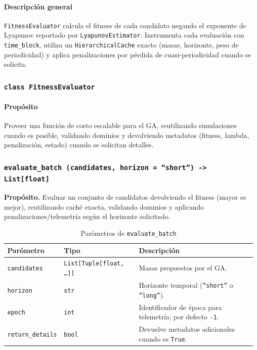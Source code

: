 \paragraph{Descripción general}
\texttt{FitnessEvaluator} calcula el fitness de cada candidato negando el exponente de Lyapunov reportado por \texttt{LyapunovEstimator}. Instrumenta cada evaluación con \texttt{time\_block}, utiliza un \texttt{HierarchicalCache} exacto (masas, horizonte, peso de periodicidad) y aplica penalizaciones por pérdida de cuasi-periodicidad cuando se solicita.

\subsubsection{\texttt{class FitnessEvaluator}}
\paragraph{Propósito} Proveer una función de costo escalable para el GA, reutilizando simulaciones cuando es posible, validando dominios y devolviendo metadatos (fitness, lambda, penalización, estado) cuando se solicitan detalles.

\subsubsection*{\texttt{evaluate\_batch~(candidates, horizon = ``short'') -> List[float]}}
\textbf{Propósito.} Evaluar un conjunto de candidatos devolviendo el fitness (mayor es mejor), reutilizando caché exacta, validando dominios y aplicando penalizaciones/telemetría según el horizonte solicitado.

\begin{table}[H]
  \centering
  \caption{Parómetros de \texttt{evaluate\_batch}}
  \small
  \begin{tabularx}{\textwidth}{@{}p{}p{}X@{}}
    \toprule
    \textbf{Parómetro} & \textbf{Tipo} & \textbf{Descripción} \\
    \midrule
    \texttt{candidates} & \texttt{List[Tuple[float, \dots]]} & Masas propuestos por el GA.\\
    \texttt{horizon} & \texttt{str} & Horizonte temporal (\texttt{``short''} o \texttt{``long''}).\\
    \texttt{epoch} & \texttt{int} & Identificador de época para telemetría; por defecto \texttt{-1}.\\
    \texttt{return\_details} & \texttt{bool} & Devuelve metadatos adicionales cuando es \texttt{True}.\\
    \bottomrule
  \end{tabularx}
\end{table}

